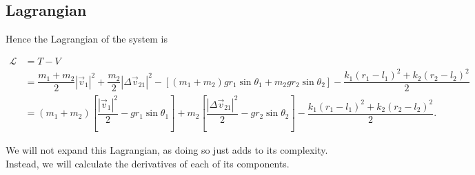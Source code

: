 \documentclass[12pt,a4paper,portrait]{article}
\newcommand{\lag}{\mathcal{L}}
\begin{document}
\begin{landscape}
\subsection{Lagrangian}
Hence the Lagrangian of the system is

\begin{align*}
	\lag &= T - V \\
	&= \dfrac{m_1+m_2}{2}|\vec{v}_1|^2 + \dfrac{m_2}{2}|\Delta \vec{v}_{21}|^2 - \left[(m_1+m_2)gr_1\sin{\theta_1} + m_2gr_2\sin{\theta_2}\right] - \dfrac{k_1(r_1-l_1)^2+k_2(r_2-l_2)^2}{2} \\
	&= (m_1+m_2)\left[\dfrac{|\vec{v}_1|^2}{2} - gr_1\sin{\theta_1}\right] + m_2\left[\dfrac{|\Delta \vec{v}_{21}|^2}{2} - gr_2\sin{\theta_2}\right]  - \dfrac{k_1(r_1-l_1)^2+k_2(r_2-l_2)^2}{2}.
\end{align*}

We will not expand this Lagrangian, as doing so just adds to its complexity. Instead, we will calculate the derivatives of each of its components. 


\end{landscape}
\end{document}
